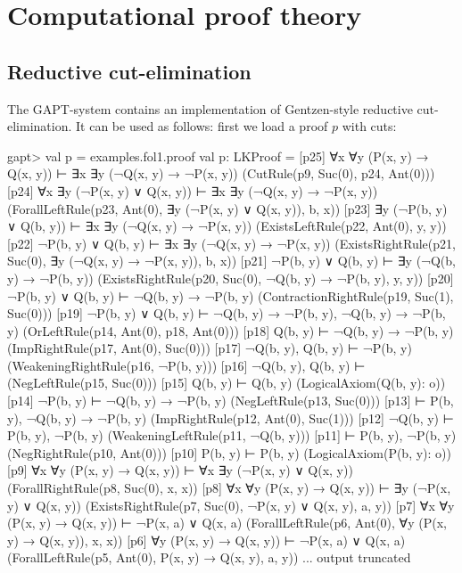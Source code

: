 \documentclass[a4paper,11pt]{book}
\begin{document}
\chapter{Computational proof theory}

\section{Reductive cut-elimination}

The GAPT-system contains an implementation of Gentzen-style reductive
cut-elimination.  It can be used as follows: first we load a proof $p$ with
cuts:

\begin{clilisting}
gapt> val p = examples.fol1.proof
val p: LKProof = [p25] ∀x ∀y (P(x, y) → Q(x, y)) ⊢ ∃x ∃y (¬Q(x, y) → ¬P(x, y))    (CutRule(p9, Suc(0), p24, Ant(0)))
[p24] ∀x ∃y (¬P(x, y) ∨ Q(x, y)) ⊢ ∃x ∃y (¬Q(x, y) → ¬P(x, y))    (ForallLeftRule(p23, Ant(0), ∃y (¬P(x, y) ∨ Q(x, y)), b, x))
[p23] ∃y (¬P(b, y) ∨ Q(b, y)) ⊢ ∃x ∃y (¬Q(x, y) → ¬P(x, y))    (ExistsLeftRule(p22, Ant(0), y, y))
[p22] ¬P(b, y) ∨ Q(b, y) ⊢ ∃x ∃y (¬Q(x, y) → ¬P(x, y))    (ExistsRightRule(p21, Suc(0), ∃y (¬Q(x, y) → ¬P(x, y)), b, x))
[p21] ¬P(b, y) ∨ Q(b, y) ⊢ ∃y (¬Q(b, y) → ¬P(b, y))    (ExistsRightRule(p20, Suc(0), ¬Q(b, y) → ¬P(b, y), y, y))
[p20] ¬P(b, y) ∨ Q(b, y) ⊢ ¬Q(b, y) → ¬P(b, y)    (ContractionRightRule(p19, Suc(1), Suc(0)))
[p19] ¬P(b, y) ∨ Q(b, y) ⊢ ¬Q(b, y) → ¬P(b, y), ¬Q(b, y) → ¬P(b, y)    (OrLeftRule(p14, Ant(0), p18, Ant(0)))
[p18] Q(b, y) ⊢ ¬Q(b, y) → ¬P(b, y)    (ImpRightRule(p17, Ant(0), Suc(0)))
[p17] ¬Q(b, y), Q(b, y) ⊢ ¬P(b, y)    (WeakeningRightRule(p16, ¬P(b, y)))
[p16] ¬Q(b, y), Q(b, y) ⊢     (NegLeftRule(p15, Suc(0)))
[p15] Q(b, y) ⊢ Q(b, y)    (LogicalAxiom(Q(b, y): o))
[p14] ¬P(b, y) ⊢ ¬Q(b, y) → ¬P(b, y)    (NegLeftRule(p13, Suc(0)))
[p13]  ⊢ P(b, y), ¬Q(b, y) → ¬P(b, y)    (ImpRightRule(p12, Ant(0), Suc(1)))
[p12] ¬Q(b, y) ⊢ P(b, y), ¬P(b, y)    (WeakeningLeftRule(p11, ¬Q(b, y)))
[p11]  ⊢ P(b, y), ¬P(b, y)    (NegRightRule(p10, Ant(0)))
[p10] P(b, y) ⊢ P(b, y)    (LogicalAxiom(P(b, y): o))
[p9] ∀x ∀y (P(x, y) → Q(x, y)) ⊢ ∀x ∃y (¬P(x, y) ∨ Q(x, y))    (ForallRightRule(p8, Suc(0), x, x))
[p8] ∀x ∀y (P(x, y) → Q(x, y)) ⊢ ∃y (¬P(x, y) ∨ Q(x, y))    (ExistsRightRule(p7, Suc(0), ¬P(x, y) ∨ Q(x, y), a, y))
[p7] ∀x ∀y (P(x, y) → Q(x, y)) ⊢ ¬P(x, a) ∨ Q(x, a)    (ForallLeftRule(p6, Ant(0), ∀y (P(x, y) → Q(x, y)), x, x))
[p6] ∀y (P(x, y) → Q(x, y)) ⊢ ¬P(x, a) ∨ Q(x, a)    (ForallLeftRule(p5, Ant(0), P(x, y) → Q(x, y), a, y))
... output truncated

\end{clilisting}
\end{document}
